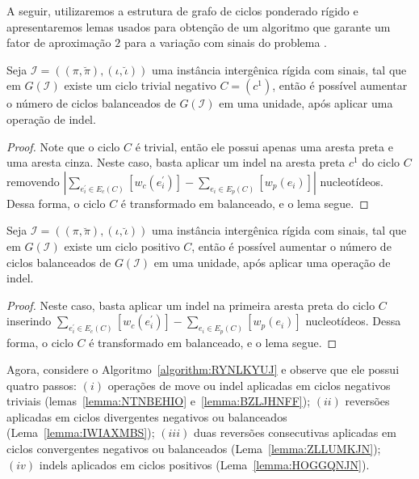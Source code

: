 A seguir, utilizaremos a estrutura de grafo de ciclos ponderado rígido e apresentaremos lemas usados para obtenção de um algoritmo que garante um fator de aproximação $2$ para a variação com sinais do problema \SbIRMI{}.

\begin{lemma}\label{lemma:BZLJHNFF}
Seja $\mathcal{I} = ((\pi,\breve\pi),(\iota,\breve\iota))$ uma instância intergênica rígida com sinais, tal que em $G(\mathcal{I})$ existe um ciclo trivial negativo $C=(c^1)$, então é possível aumentar o número de ciclos balanceados de $G(\mathcal{I})$ em uma unidade, após aplicar uma operação de indel.
\end{lemma}
\begin{proof}
Note que o ciclo $C$ é trivial, então ele possui apenas uma aresta preta e uma aresta cinza. Neste caso, basta aplicar um indel na aresta preta $c^1$ do ciclo $C$ removendo $|\sum_{e^{\prime}_i \in E_c(C)} [w_c(e^{\prime}_i)] - \sum_{e_i \in E_p(C)} [w_p(e_i)]|$ nucleotídeos. Dessa forma, o ciclo $C$ é transformado em balanceado, e o lema segue.
\end{proof}

\begin{lemma}\label{lemma:HOGGQNJN}
Seja $\mathcal{I} = ((\pi,\breve\pi),(\iota,\breve\iota))$ uma instância intergênica rígida com sinais, tal que em $G(\mathcal{I})$ existe um ciclo positivo $C$, então é possível aumentar o número de ciclos balanceados de $G(\mathcal{I})$ em uma unidade, após aplicar uma operação de indel.
\end{lemma}
\begin{proof}
Neste caso, basta aplicar um indel na primeira aresta preta do ciclo $C$ inserindo $\sum_{e^{\prime}_i \in E_c(C)} [w_c(e^{\prime}_i)] - \sum_{e_i \in E_p(C)} [w_p(e_i)]$ nucleotídeos. Dessa forma, o ciclo $C$ é transformado em balanceado, e o lema segue. 
\end{proof}

Agora, considere o Algoritmo~\ref{algorithm:RYNLKYUJ} e observe que ele possui quatro passos: $(i)$ operações de move ou indel aplicadas em ciclos negativos triviais (lemas~\ref{lemma:NTNBEHIO} e~\ref{lemma:BZLJHNFF}); $(ii)$ reversões aplicadas em ciclos divergentes negativos ou balanceados (Lema~\ref{lemma:IWIAXMBS}); $(iii)$ duas reversões consecutivas aplicadas em ciclos convergentes negativos ou balanceados (Lema~\ref{lemma:ZLLUMKJN}); $(iv)$ indels aplicados em ciclos positivos (Lema~\ref{lemma:HOGGQNJN}).




